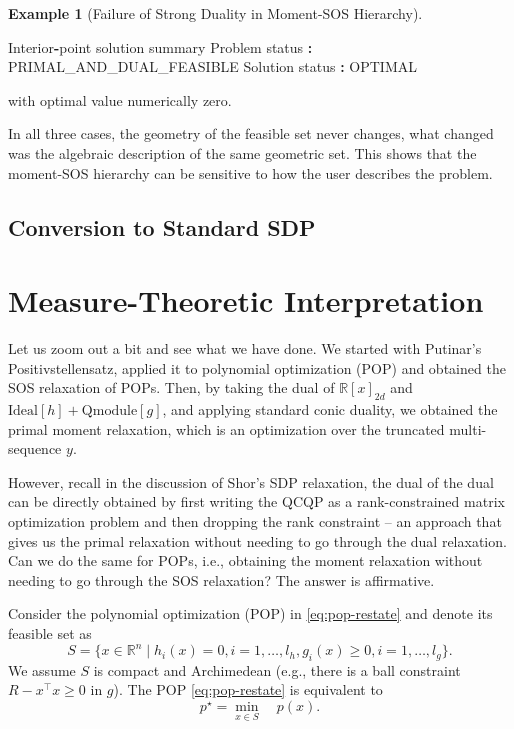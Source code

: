 \documentclass[
]{book}
\newenvironment{Shaded}{\begin{snugshade}}{\end{snugshade}}
\newcommand{\OperatorTok}[1]{\textcolor[rgb]{0.81,0.36,0.00}{\textbf{#1}}}
\newcommand{\VariableTok}[1]{\textcolor[rgb]{0.00,0.00,0.00}{#1}}
\theoremstyle{definition}
\theoremstyle{definition}
\newtheorem{example}{Example}[chapter]
\theoremstyle{definition}
\theoremstyle{definition}
\theoremstyle{remark}
\begin{document}
\begin{example}[Failure of Strong Duality in Moment-SOS Hierarchy]
\begin{Shaded}
\begin{Highlighting}[]
\VariableTok{Interior}\OperatorTok{{-}}\VariableTok{point} \VariableTok{solution} \VariableTok{summary}
  \VariableTok{Problem} \VariableTok{status}  \OperatorTok{:} \VariableTok{PRIMAL\_AND\_DUAL\_FEASIBLE}
  \VariableTok{Solution} \VariableTok{status} \OperatorTok{:} \VariableTok{OPTIMAL}
\end{Highlighting}
\end{Shaded}

with optimal value numerically zero.

In all three cases, the geometry of the feasible set never changes, what changed was the algebraic description of the same geometric set. This shows that the moment-SOS hierarchy can be sensitive to how the user describes the problem.
\end{example}

\subsection{Conversion to Standard SDP}\label{conversion-to-standard-sdp}

\section{Measure-Theoretic Interpretation}\label{measure-theoretic-interpretation}

Let us zoom out a bit and see what we have done. We started with Putinar's Positivstellensatz, applied it to polynomial optimization (POP) and obtained the SOS relaxation of POPs. Then, by taking the dual of \(\mathbb{R}[x]_{2d}\) and \(\mathrm{Ideal}[h] + \mathrm{Qmodule}[g]\), and applying standard conic duality, we obtained the primal moment relaxation, which is an optimization over the truncated multi-sequence \(y\).

However, recall in the discussion of Shor's SDP relaxation, the dual of the dual can be directly obtained by first writing the QCQP as a rank-constrained matrix optimization problem and then dropping the rank constraint -- an approach that gives us the primal relaxation without needing to go through the dual relaxation. Can we do the same for POPs, i.e., obtaining the moment relaxation without needing to go through the SOS relaxation? The answer is affirmative.

Consider the polynomial optimization (POP) in \eqref{eq:pop-restate} and denote its feasible set as
\[
S = \{ x \in \mathbb{R}^{n} \mid h_i(x)=0,i=1,\dots,l_h, g_i(x)\geq 0, i=1,\dots,l_g \}.
\]
We assume \(S\) is compact and Archimedean (e.g., there is a ball constraint \(R - x^\top x \geq 0\) in \(g\)). The POP \eqref{eq:pop-restate} is equivalent to
\begin{equation}
p^\star = \min_{x \in S} \quad p(x).
\label{eq:pop-with-S}
\end{equation}
\end{document}
